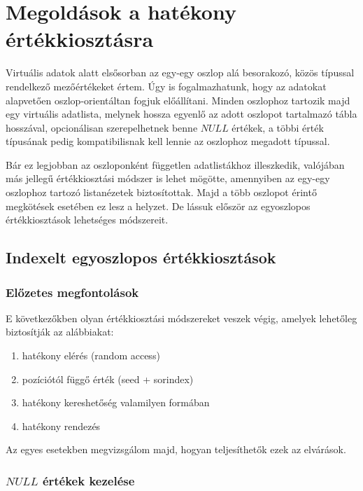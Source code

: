 \documentclass[
    parspace, %
    noindent, %
]{elteiktdk}[2023/10/30]
\begin{document}

\section{Megoldások a hatékony értékkiosztásra}

Virtuális adatok alatt elsősorban az egy-egy oszlop alá besorakozó,
közös típussal rendelkező mezőértékeket értem.
Úgy is fogalmazhatunk, hogy az adatokat alapvetően oszlop-orientáltan fogjuk előállítani.
Minden oszlophoz tartozik majd egy virtuális adatlista,
melynek hossza egyenlő az adott oszlopot tartalmazó tábla hosszával,
opcionálisan szerepelhetnek benne $NULL$ értékek,
a többi érték típusának pedig kompatibilisnak kell lennie az oszlophoz megadott típussal.

Bár ez legjobban az oszloponként független adatlistákhoz illeszkedik,
valójában más jellegű értékkiosztási módszer is lehet mögötte,
amennyiben az egy-egy oszlophoz tartozó listanézetek biztosítottak.
Majd a több oszlopot érintő megkötések esetében ez lesz a helyzet.
De lássuk először az egyoszlopos értékkiosztások lehetséges módszereit.

\subsection{Indexelt egyoszlopos értékkiosztások}

\subsubsection{Előzetes megfontolások}

E következőkben olyan értékkiosztási módszereket veszek végig,
amelyek lehetőleg biztosítják az alábbiakat:

\begin{enumerate}
  \item hatékony elérés (random access)
  \item pozíciótól függő érték (seed + sorindex)
  \item hatékony kereshetőség valamilyen formában
  \item hatékony rendezés
\end{enumerate}

Az egyes esetekben megvizsgálom majd, hogyan teljesíthetők ezek az elvárások.

\subsubsection{$NULL$ értékek kezelése}
\end{document}
